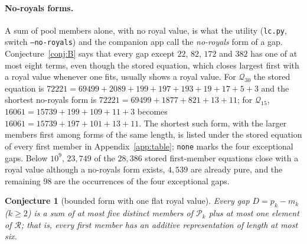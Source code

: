 \documentclass[11pt,a4paper]{article}
\newtheorem{conjecture}{Conjecture}
\newcommand{\Q}{\mathcal{Q}}
\newcommand{\Pool}{\mathcal{P}}
\newcommand{\R}{\mathcal{R}}
\newcommand{\code}[1]{\texttt{#1}}
\begin{document}
\paragraph{No-royals forms.}
A sum of pool members alone, with no royal value, is what the utility
(\code{lc.py}, switch \code{--no-royals}) and the companion app call the
\emph{no-royals} form of a gap. Conjecture~\ref{conj:B} says that every
gap except $22$, $82$, $172$ and $382$ has one of at most eight terms,
even though the stored equation, which closes largest first with a royal
value whenever one fits, usually shows a royal value. For $\Q_{30}$ the
stored equation is
$72221 = 69499 + 2089 + 199 + 197 + 193 + 19 + 17 + 5 + 3$ and the
shortest no-royals form is $72221 = 69499 + 1877 + 821 + 13 + 11$; for
$\Q_{15}$, $16061 = 15739 + 199 + 109 + 11 + 3$ becomes
$16061 = 15739 + 197 + 101 + 13 + 11$. The shortest such form, with the
larger members first among forms of the same length, is listed under the
stored equation of every first member in Appendix~\ref{app:table};
\code{none} marks the four exceptional gaps. Below $10^9$, $23{,}749$ of
the $28{,}386$ stored first-member equations close with a royal value
although a no-royals form exists, $4{,}539$ are already pure, and the
remaining $98$ are the occurrences of the four exceptional gaps.

\begin{conjecture}[bounded form with one flat royal value]
\label{conj:C}
Every gap $D=p_k-m_k$ ($k\ge2$) is a sum of at most five distinct members
of $\Pool_k$ plus at most one element of $\R$; that is, every first member
has an additive representation of length at most six.
\end{conjecture}
\end{document}
